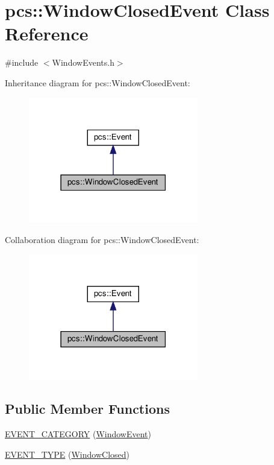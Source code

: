 \hypertarget{classpcs_1_1WindowClosedEvent}{}\section{pcs\+:\+:Window\+Closed\+Event Class Reference}
\label{classpcs_1_1WindowClosedEvent}


{\ttfamily \#include $<$Window\+Events.\+h$>$}



Inheritance diagram for pcs\+:\+:Window\+Closed\+Event\+:\nopagebreak
\begin{figure}[H]
\begin{center}
\leavevmode
\includegraphics[width=210pt]{classpcs_1_1WindowClosedEvent__inherit__graph}
\end{center}
\end{figure}


Collaboration diagram for pcs\+:\+:Window\+Closed\+Event\+:\nopagebreak
\begin{figure}[H]
\begin{center}
\leavevmode
\includegraphics[width=210pt]{classpcs_1_1WindowClosedEvent__coll__graph}
\end{center}
\end{figure}
\subsection*{Public Member Functions}
\begin{DoxyCompactItemize}
\item 
\hyperlink{classpcs_1_1WindowClosedEvent_a01cbccdbd9cdf31dcda990e6dde02ebc}{E\+V\+E\+N\+T\+\_\+\+C\+A\+T\+E\+G\+O\+RY} (\hyperlink{namespacepcs_a3538ef524602fc09ddb40acc72480c60a5fb31ca24b241c5c6af3df6930ef53ba}{Window\+Event})
\item 
\hyperlink{classpcs_1_1WindowClosedEvent_a3be0e69e0cb2de9b4f5d1845bc3735cb}{E\+V\+E\+N\+T\+\_\+\+T\+Y\+PE} (\hyperlink{namespacepcs_a12954f53e3d7d6a8765fd723e1ce8db4a7c87dff2b968b5c85baf1def063c776d}{Window\+Closed})
\end{DoxyCompactItemize}
